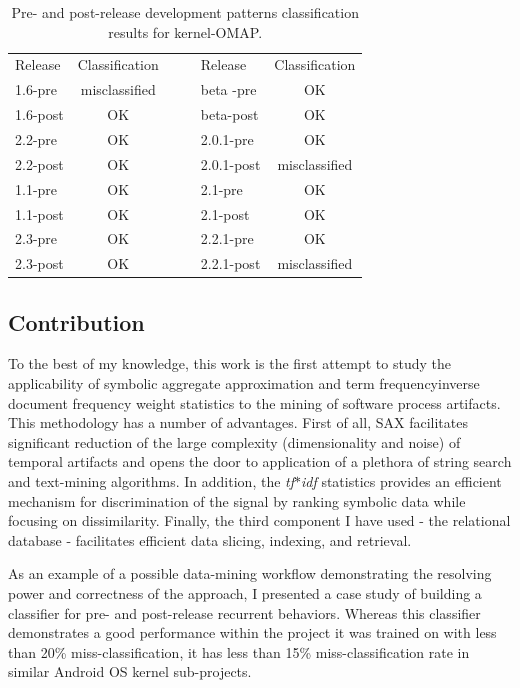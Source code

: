 \documentclass[conference]{IEEEtran}
\begin{document}
\begin{table}
  \caption{Pre- and post-release development patterns classification results for kernel-OMAP.}
  \label{tab:success}
  \begin{tabular}{ | l | c | c c | l | c |}
  \cline{1-2} \cline{5-6}
  Release & Classification& & & Release & Classification\\
  \cline{1-2} \cline{5-6}
1.6-pre & misclassified & & & beta -pre & OK \\
1.6-post & OK & & & beta-post & OK \\
2.2-pre & OK & & & 2.0.1-pre & OK \\
2.2-post & OK & & & 2.0.1-post & misclassified \\
1.1-pre & OK & & & 2.1-pre & OK \\
1.1-post & OK & & & 2.1-post & OK \\
2.3-pre & OK & & & 2.2.1-pre & OK \\
2.3-post & OK & & & 2.2.1-post & misclassified \\ 
  \cline{1-2} \cline{5-6}
  \end{tabular}
\end{table}

\subsection{Contribution}
To the best of my knowledge, this work is the first attempt to study the applicability
of symbolic aggregate approximation and term frequency\textendash inverse document frequency
weight statistics to the mining of software process artifacts. 
This methodology has a number of advantages. First of all, SAX facilitates significant 
reduction of the large complexity (dimensionality and noise) of temporal artifacts 
and opens the door to application of a plethora of string search and text-mining algorithms.
In addition, the \textit{tf$\ast$idf} statistics provides an efficient mechanism for 
discrimination of the signal by ranking symbolic data while focusing on dissimilarity.
Finally, the third component I have used - the relational database - facilitates 
efficient data slicing, indexing, and retrieval.

As an example of a possible data-mining workflow demonstrating the resolving power 
and correctness of the approach, I presented a case study of building a classifier
for pre- and post-release recurrent behaviors. 
Whereas this classifier demonstrates a good performance within the project it was 
trained on with less than 20\% miss-classification, it has less than 15\% 
miss-classification rate in similar Android OS kernel sub-projects.
\end{document}
